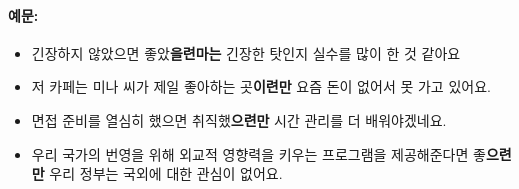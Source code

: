 \documentclass[a4paper, 11pt, oneside]{book}
\begin{document}
\paragraph{예문:}
\begin{itemize}
	\item 긴장하지 않았으면 좋았\textbf{을련마는} 긴장한 탓인지 실수를 많이 한 것 같아요 
	\item 저 카페는 미나 씨가 제일 좋아하는 곳\textbf{이련만} 요즘 돈이 없어서 못 가고 있어요.
	\item 면접 준비를 열심히 했으면 취직했\textbf{으련만} 시간 관리를 더 배워야겠네요. 
	\item 우리 국가의 번영을 위해 외교적 영향력을 키우는 프로그램을 제공해준다면 좋\textbf{으련만} 우리 정부는 국외에 대한 관심이 없어요.   
\end{itemize}
\end{document}
